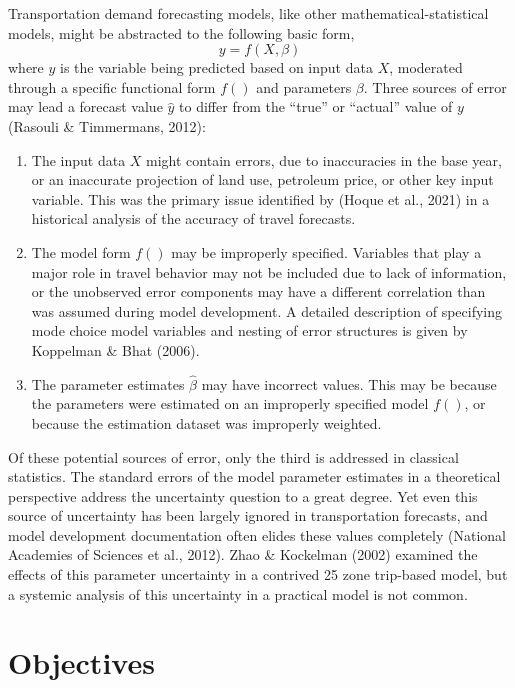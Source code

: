 \documentclass[fancy, masters,twoside]{byuthesis}
\begin{document}
Transportation demand forecasting models, like other mathematical-statistical models, might be abstracted to the following basic form,
\begin{equation}
y = f(X, \beta)
\end{equation}
where \(y\) is the variable being predicted based on input data \(X\), moderated through a specific functional form \(f()\) and parameters \(\beta\). Three sources of error may lead a forecast value \(\hat{y}\) to differ from the ``true'' or ``actual'' value of \(y\) (Rasouli \& Timmermans, 2012):

\begin{enumerate}
\def\labelenumi{\arabic{enumi}.}
\item
  The input data \(X\) might contain errors, due to inaccuracies in the base year, or an inaccurate projection of land use, petroleum price, or other key input variable. This was the primary issue identified by (Hoque et al., 2021) in a historical analysis of the accuracy of travel forecasts.
\item
  The model form \(f()\) may be improperly specified. Variables that play a major role in travel behavior may not be included due to lack of information, or the unobserved error components may have a different correlation than was assumed during model development. A detailed description of specifying mode choice model variables and nesting of error structures is given by Koppelman \& Bhat (2006).
\item
  The parameter estimates \(\hat{\beta}\) may have incorrect values. This may be because the parameters were estimated on an improperly specified model \(f()\), or because the estimation dataset was improperly weighted.
\end{enumerate}

Of these potential sources of error, only the third is addressed in classical statistics. The standard errors of the model parameter estimates in a theoretical perspective address the uncertainty question to a great degree. Yet even this source of uncertainty has been largely ignored in transportation forecasts, and model development documentation often elides these values completely (National Academies of Sciences et al., 2012). Zhao \& Kockelman (2002) examined the effects of this parameter uncertainty in a contrived 25 zone trip-based model, but a systemic analysis of this uncertainty in a practical model is not common.

\hypertarget{objectives}{%
\section{Objectives}\label{objectives}}
\end{document}
